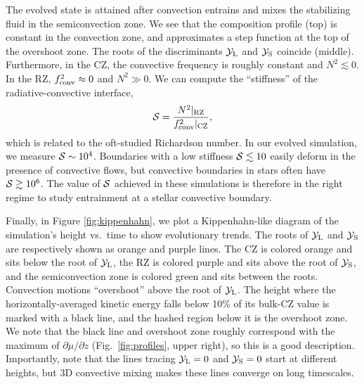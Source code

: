 The evolved state is attained after convection entrains and mixes the stabilizing fluid in the semiconvection zone.
We see that the composition profile (top) is constant in the convection zone, and approximates a step function at the top of the overshoot zone.
The roots of the discriminants $\mathcal{Y}_{\rm{L}}$ and $\mathcal{Y}_{\rm{S}}$ coincide (middle).
Furthermore, in the CZ, the convective frequency is roughly constant and $N^2 \lesssim 0$.
In the RZ, $f_{\rm{conv}}^2 \approx 0$ and $N^2 \gg 0$.
We can compute the ``stiffness'' of the radiative-convective interface,
\begin{equation}
\mS = \frac{N^2|_{\rm{RZ}}}{f_{\rm{conv}}^2|_{\rm{CZ}}},
\label{eqn:stiffness}
\end{equation}
which is related to the oft-studied Richardson number.
In our evolved simulation, we measure $\mathcal{S} \sim 10^{4}$.
Boundaries with a low stiffness $\mathcal{S} \lesssim 10$ easily deform in the presence of convective flows, but convective boundaries in stars often have $\mathcal{S} \gtrsim 10^6$.
The value of $\mathcal{S}$ achieved in these simulations is therefore in the right regime to study entrainment at a stellar convective boundary.

Finally, in Figure \ref{fig:kippenhahn}, we plot a Kippenhahn-like diagram of the simulation's height vs.~time to show evolutionary trends.
The roots of $\mathcal{Y}_{\rm{L}}$ and $\mathcal{Y}_{\rm{S}}$ are respectively shown as orange and purple lines.
The CZ is colored orange and sits below the root of $\mathcal{Y}_{\rm{L}}$, the RZ is colored purple and sits above the root of $\mathcal{Y}_{\rm{S}}$, and the semiconvection zone is colored green and sits between the roots.
Convection motions ``overshoot'' above the root of $\mathcal{Y}_{\rm{L}}$.
The height where the horizontally-averaged kinetic energy falls below 10\% of its bulk-CZ value is marked with a black line, and the hashed region below it is the overshoot zone.
We note that the black line and overshoot zone roughly correspond with the maximum of $\partial\mu/\partial z$ (Fig.~\ref{fig:profiles}, upper right), so this is a good description.
Importantly, note that the lines tracing $\mathcal{Y}_{\rm{L}} = 0$ and $\mathcal{Y}_{\rm{S}} = 0$ start at different heights, but 3D convective mixing makes these lines converge on long timescales.


